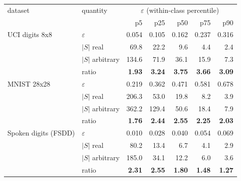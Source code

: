 \begin{tabular}{llrrrrr}
\toprule
dataset & quantity & \multicolumn{5}{c}{$\varepsilon$ (within-class percentile)} \\
& & p5 & p25 & p50 & p75 & p90 \\
\midrule
UCI digits 8x8 & $\varepsilon$ & 0.054 & 0.105 & 0.162 & 0.237 & 0.316 \\
 & $|S|$ real & 69.8 & 22.2 & 9.6 & 4.4 & 2.4 \\
 & $|S|$ arbitrary & 134.6 & 71.9 & 36.1 & 15.9 & 7.3 \\
 & ratio & \textbf{1.93} & \textbf{3.24} & \textbf{3.75} & \textbf{3.66} & \textbf{3.09} \\
\midrule
MNIST 28x28 & $\varepsilon$ & 0.219 & 0.362 & 0.471 & 0.581 & 0.678 \\
 & $|S|$ real & 206.3 & 53.0 & 19.8 & 8.2 & 3.9 \\
 & $|S|$ arbitrary & 362.2 & 129.4 & 50.6 & 18.4 & 7.9 \\
 & ratio & \textbf{1.76} & \textbf{2.44} & \textbf{2.55} & \textbf{2.25} & \textbf{2.03} \\
\midrule
Spoken digits (FSDD) & $\varepsilon$ & 0.010 & 0.028 & 0.040 & 0.054 & 0.069 \\
 & $|S|$ real & 80.2 & 13.4 & 6.7 & 4.1 & 2.9 \\
 & $|S|$ arbitrary & 185.0 & 34.1 & 12.2 & 6.0 & 3.6 \\
 & ratio & \textbf{2.31} & \textbf{2.55} & \textbf{1.80} & \textbf{1.48} & \textbf{1.27} \\
\bottomrule
\end{tabular}

